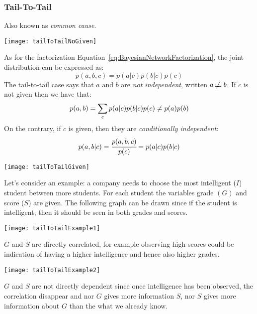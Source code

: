 \subsubsection{Tail-To-Tail}
Also known as \textit{common cause}.
\begin{center}
	\texttt{[image: tailToTailNoGiven]}
\end{center}
As for the factorization Equation~\ref{eq:BayesianNetworkFactorization}, the joint distribution can be expressed as:
\[
	p(a,b,c)=p(a\vert c)p(b\vert c)p(c)
\]
The tail-to-tail case says that $a$ and $b$ are \textit{not independent}, written $a \not\!\perp\!\!\!\perp b$. %
If $c$ is not given then we have that:
\[
	p(a,b)=\displaystyle\sum_cp(a\vert c)p(b\vert c)p(c)\neq p(a)p(b)
\] 
On the contrary, if $c$ is given, then they are \textit{conditionally independent}:
\[
p(a,b\vert c)=\cfrac{p(a,b,c)}{p(c)}=p(a\vert c)p(b\vert c)
\] 
\begin{center}
	\texttt{[image: tailToTailGiven]}
\end{center}
Let's consider an example: a company needs to choose the most intelligent ($I$) student between more students. For each student the variables grade $(G)$ and score ($S$) are given. The following graph can be drawn since if the student is intelligent, then it should be seen in both grades and scores. \newline
\begin{minipage}[htp]{\linewidth}
	\begin{minipage}[t]{0.48\linewidth}
		\begin{center}
			\texttt{[image: tailToTailExample1]}
		\end{center}
		$G$ and $S$ are directly correlated, for example observing high scores could be indication of having a higher intelligence and hence also higher grades. 
	\end{minipage}
	\hspace{0.04\linewidth}
	\begin{minipage}[t]{0.48\linewidth}
		\begin{center}
			\texttt{[image: tailToTailExample2]}
		\end{center}
		$G$ and $S$ are not directly dependent since once intelligence has been observed, the correlation disappear and nor $G$ gives more information $S$, nor $S$ gives more information about $G$ than the what we already know. 
	\end{minipage}
\end{minipage}
%
